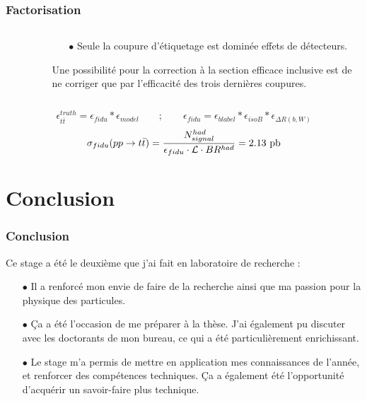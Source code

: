 \documentclass[usepdftitle=false,green]{beamer}
\begin{document}
\begin{frame}
	\frametitle{Factorisation}
	\begin{columns}
		\begin{column}{6.2cm}
			\begin{figure}
			\end{figure}
		\end{column}
		\begin{column}{6.2cm}
			\begin{itemize}
				\item[$\bullet$] Seule la coupure d'étiquetage est dominée effets de détecteurs.
			\end{itemize}
			Une possibilité pour la correction à la section efficace inclusive est de ne corriger que par l'efficacité des trois dernières coupures.
		\end{column}
	\end{columns}
	\begin{equation*}
		\epsilon_{t\bar t}^{truth} = \epsilon_{fidu} * \epsilon_{model} \qquad ; \qquad \epsilon_{fidu} = \epsilon_{blabel}*\epsilon_{isoB}*\epsilon_{\Delta R(b,W)}
	\end{equation*}
	\begin{equation*}
		\sigma_{fidu}(pp\rightarrow t\bar t) = \frac{N_{signal}^{had}}{\epsilon_{fidu} \cdot \mathcal L \cdot BR^{had}} = 2.13~\textup{pb}
	\end{equation*}
\end{frame}

\section*{Conclusion}
\begin{frame}
	\frametitle{Conclusion}
	 Ce stage a été le deuxième que j'ai fait en laboratoire de recherche : 
	\begin{itemize}
		\item[$\bullet$] Il a renforcé mon envie de faire de la recherche ainsi que ma passion pour la physique des particules.
		\item[$\bullet$] \c Ca a été l'occasion de me préparer à la thèse. J'ai également pu discuter avec les doctorants de mon bureau, ce qui a été particulièrement enrichissant.
		\item[$\bullet$] Le stage m'a permis de mettre en application mes connaissances de l'année, et renforcer des compétences techniques. \c Ca a également été l'opportunité d'acquérir un savoir-faire plus technique.
	\end{itemize}
\end{frame}
	
\end{document}
